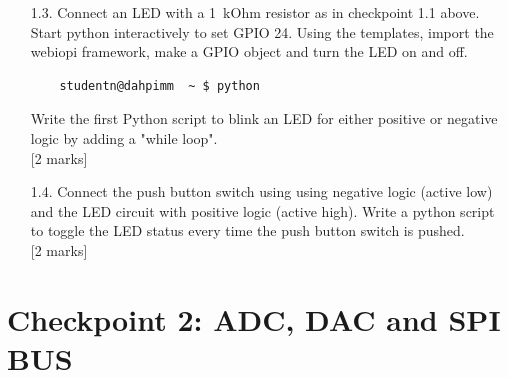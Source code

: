 \begin{enumerate}
\item [1.3.]  Connect an LED with a 1~kOhm resistor as in checkpoint 1.1 above. Start python interactively to set GPIO 24.   Using the templates, import the webiopi framework, make a GPIO object and turn the LED on and off.
%
\begin{verbatim}
    studentn@dahpimm  ~ $ python
\end{verbatim}



Write the first Python script to blink an LED for either positive or negative logic 
by adding a "while loop".\\


\vspace*{-0.5cm}
\hfill [2 marks]\\


\item [1.4.]	  Connect the push button switch using  using negative logic (active low)  and the LED circuit with positive logic (active high).  Write a python script to toggle the LED status every time the push button switch is pushed. \\


\vspace*{-0.5cm}
\hfill [2 marks]\\


\end{enumerate}



\newpage
\section{Checkpoint 2: ADC, DAC and  SPI BUS}

